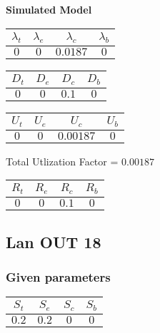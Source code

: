 \documentclass{article}
\begin{document}
\begin{minipage}{0.5\textwidth}
\centering	\textbf{Simulated Model}
\begin{table}[H]
\centering
\begin{tabular}{@{}cccc@{}}
\toprule
$\lambda_t$ & $\lambda_e$ & $\lambda_c$ & $\lambda_b$\\
\midrule
$0$ & $0$ & $0.0187$ & $0$\\
\bottomrule
\end{tabular}
\end{table}
\begin{table}[H]
\centering
\begin{tabular}{@{}cccc@{}}
\toprule
$D_t$ & $D_e$ & $D_c$ & $D_b$\\
\midrule
$0$ & $0$ & $0.1$ & $0$\\
\bottomrule
\end{tabular}
\end{table}\begin{table}[H]
\centering
\begin{tabular}{@{}cccc@{}}
\toprule
$U_t$ & $U_e$ & $U_c$ & $U_b$\\
\midrule
$0$ & $0$ & $0.00187$ & $0$\\
\bottomrule
\end{tabular}
\end{table}
\centering Total Utlization Factor = $0.00187$
\begin{table}[H]
\centering
\begin{tabular}{@{}cccc@{}}
\toprule
$R_t$ & $R_e$ & $R_c$ & $R_b$\\
\midrule
$0$ & $0$ & $0.1$ & $0$\\
\bottomrule
\end{tabular}
\end{table}
\end{minipage}\subsection{Lan OUT 18}
\subsubsection{Given parameters}
\begin{table}[H]
\centering
\begin{tabular}{@{}cccc@{}}
\toprule
$S_t$ & $S_e$ & $S_c$ & $S_b$\\
\midrule
$0.2$ & $0.2$ & $0$ & $0$\\
\bottomrule
\end{tabular}
\end{table}
\end{document}

